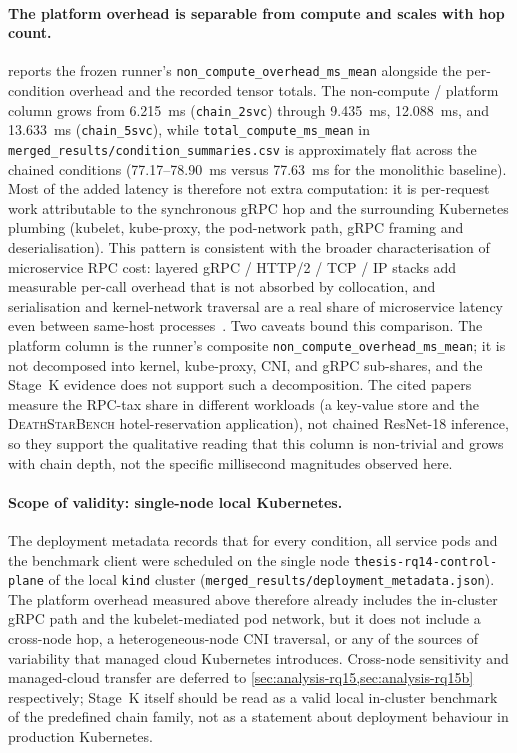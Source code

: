 \paragraph{The platform overhead is separable from compute and scales with hop count.}
 reports the frozen runner's
\texttt{non\_compute\_overhead\_ms\_mean} alongside the per-condition
overhead and the recorded tensor totals. The non-compute / platform
column grows from 6.215~ms (\texttt{chain\_2svc}) through 9.435~ms,
12.088~ms, and 13.633~ms (\texttt{chain\_5svc}), while
\texttt{total\_compute\_ms\_mean} in
\texttt{merged\_results/condition\_summaries.csv} is approximately
flat across the chained conditions (77.17--78.90~ms versus 77.63~ms
for the monolithic baseline). Most of the added latency is therefore
not extra computation: it is per-request work attributable to the
synchronous gRPC hop and the surrounding Kubernetes plumbing
(kubelet, kube-proxy, the pod-network path, gRPC framing and
deserialisation). This pattern is consistent with the broader
characterisation of microservice RPC cost: layered gRPC / HTTP/2 /
TCP / IP stacks add measurable per-call overhead that is not absorbed
by collocation, and serialisation and kernel-network traversal are a
real share of microservice latency even between same-host
processes~\cite{rpc_overhead_hotos25,notnets_apsys24}. Two caveats
bound this comparison. The platform column is the runner's composite
\texttt{non\_compute\_overhead\_ms\_mean}; it is not decomposed into
kernel, kube-proxy, CNI, and gRPC sub-shares, and the Stage~K evidence
does not support such a decomposition. The cited papers measure the
RPC-tax share in different workloads (a key-value store and the
\textsc{DeathStarBench} hotel-reservation application), not chained
ResNet-18 inference, so they support the qualitative reading that
this column is non-trivial and grows with chain depth, not the
specific millisecond magnitudes observed here.

\paragraph{Scope of validity: single-node local Kubernetes.}
The deployment metadata records that for every condition, all service
pods and the benchmark client were scheduled on the single node
\texttt{thesis-rq14-control-plane} of the local \texttt{kind} cluster
(\texttt{merged\_results/deployment\_metadata.json}). The platform
overhead measured above therefore already includes the in-cluster
gRPC path and the kubelet-mediated pod network, but it does not
include a cross-node hop, a heterogeneous-node CNI traversal, or any
of the sources of variability that managed cloud Kubernetes
introduces. Cross-node sensitivity and managed-cloud transfer are
deferred to \cref{sec:analysis-rq15,sec:analysis-rq15b} respectively;
Stage~K itself should be read as a valid local in-cluster benchmark of
the predefined chain family, not as a statement about deployment
behaviour in production Kubernetes.

